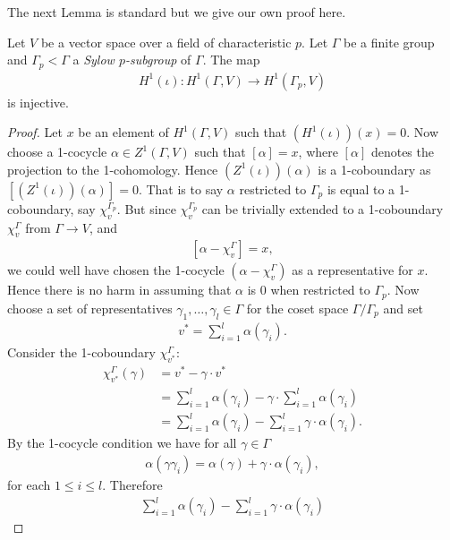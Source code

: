 The next Lemma is standard \cite[Theorem 10.3]{brown1976cohomology} but we give our own proof here.
\begin{lemma}
Let $V$ be a vector space over a field of characteristic $p$. Let $\Gamma$ be a finite group and $\Gamma_p < \Gamma$ a \emph{Sylow $p$-subgroup} of $\Gamma$. The map 
\begin{align*}
H^1(\iota):H^1(\Gamma, V)\rightarrow H^1(\Gamma_p, V)
\end{align*}
is injective.
\label{lem:a_h_restriction}
\end{lemma}
\begin{proof}
Let $x$ be an element of $H^1(\Gamma, V)$ such that $\left(H^1(\iota)\right)(x) = 0$. Now choose a 1-cocycle $\alpha \in Z^1(\Gamma, V)$ such that $[\alpha] = x$, where $[\alpha]$ denotes the projection to the 1-cohomology. Hence $\left(Z^1(\iota)\right)(\alpha)$ is a 1-coboundary as $\left[\left(Z^1(\iota)\right)(\alpha)\right] = 0$. That is to say $\alpha$ restricted to $\Gamma_p$ is equal to a 1-coboundary, say $\chi_v^{\Gamma_p}$. But since $\chi_v^{\Gamma_p}$ can be trivially extended to a 1-coboundary $\chi_v^\Gamma$ from $\Gamma\rightarrow V$, and \begin{align*}
	\left[\alpha - \chi_v^\Gamma\right] = x,
\end{align*}
we could well have chosen the 1-cocycle $(\alpha - \chi_v^\Gamma)$ as a representative for $x$. Hence there is no harm in assuming that $\alpha$ is 0 when restricted to $\Gamma_p$.
Now choose a set of representatives $\gamma_1, \ldots, \gamma_l \in \Gamma$ for the coset space $\Gamma/\Gamma_p$ and set
\begin{align*}
	v^* = \sum_{i =1}^l \alpha(\gamma_i).
\end{align*}
Consider the 1-coboundary $\chi_{v^*}^\Gamma$:
\begin{align*}
	\chi_{v^*}^\Gamma(\gamma) &=  v^* - \gamma\cdot v^* \\
	&=  \sum_{i = 1}^l\alpha(\gamma_i) - \gamma\cdot \sum_{i = 1}^l\alpha(\gamma_i) \\
	&=  \sum_{i = 1}^l\alpha(\gamma_i) - \sum_{i = 1}^l \gamma\cdot \alpha(\gamma_i).
\end{align*}
By the 1-cocycle condition we have for all $\gamma \in \Gamma$
\begin{align*}
	\alpha(\gamma \gamma_i) = \alpha(\gamma) + \gamma\cdot\alpha(\gamma_i),
\end{align*}
for each $1 \leq i \leq l$. Therefore
\begin{align*}
	 \sum_{i = 1}^l\alpha(\gamma_i) - \sum_{i = 1}^l \gamma\cdot \alpha(\gamma_i) 

\end{align*}
\end{proof}
